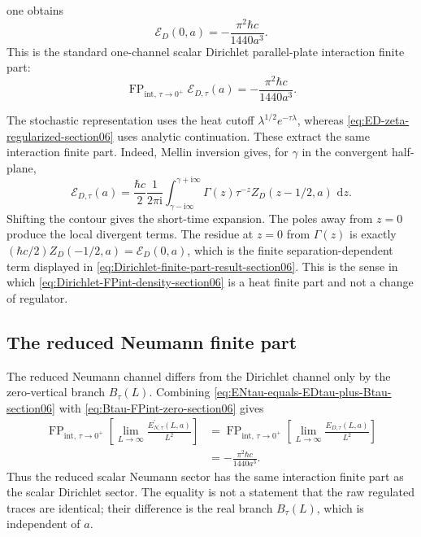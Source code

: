 \documentclass[11pt]{article}
\providecommand{\ii}{\mathrm{i}}
\providecommand{\dd}{\,\mathrm{d}}
\providecommand{\hbarc}{\hbar c}
\providecommand{\FP}{\operatorname{FP}}
\providecommand{\EDtau}{E_{D,\tau}}
\providecommand{\ENtau}{E_{N,\tau}^{\prime}}
\providecommand{\Btau}{B_{\tau}}
\numberwithin{equation}{section}
\begin{document}
one obtains
\begin{equation}
\label{eq:Dirichlet-finite-part-result-section06}
    \mathcal E_D(0,a)
    =
    -\frac{\pi^2\hbarc}{1440a^3}.
\end{equation}
This is the standard one-channel scalar Dirichlet parallel-plate interaction
finite part:
\begin{equation}
\label{eq:Dirichlet-FPint-density-section06}
    \FP_{\mathrm{int},\,\tau\to0^+}\mathcal E_{D,\tau}(a)
    =
    -\frac{\pi^2\hbarc}{1440a^3}.
\end{equation}

\begin{remark}
\label{rem:heat-zeta-compatibility-section06}
The stochastic representation uses the heat cutoff
\(\lambda^{1/2}e^{-\tau\lambda}\), whereas
\eqref{eq:ED-zeta-regularized-section06} uses analytic continuation.  These
extract the same interaction finite part.  Indeed, Mellin inversion gives,
for \(\gamma\) in the convergent half-plane,
\begin{equation}
\label{eq:Mellin-heat-zeta-section06}
    \mathcal E_{D,\tau}(a)
    =
    \frac{\hbarc}{2}\frac{1}{2\pi\ii}
    \int_{\gamma-\ii\infty}^{\gamma+\ii\infty}
    \Gamma(z)\tau^{-z}Z_D(z-1/2,a)\,\dd z .
\end{equation}
Shifting the contour gives the short-time expansion.  The poles away from
\(z=0\) produce the local divergent terms.  The residue at \(z=0\) from
\(\Gamma(z)\) is exactly \((\hbarc/2)Z_D(-1/2,a)
=\mathcal E_D(0,a)\), which is the finite separation-dependent term displayed
in \eqref{eq:Dirichlet-finite-part-result-section06}.  This is the sense in
which \eqref{eq:Dirichlet-FPint-density-section06} is a heat finite part and
not a change of regulator.
\end{remark}

\subsection{The reduced Neumann finite part}
\label{subsec:reduced-neumann-finite-part-section06}

The reduced Neumann channel differs from the Dirichlet channel only by the
zero-vertical branch \(\Btau(L)\).  Combining
\eqref{eq:ENtau-equals-EDtau-plus-Btau-section06} with
\eqref{eq:Btau-FPint-zero-section06} gives
\begin{align}
\label{eq:Neumann-FPint-equals-Dirichlet-section06}
    \FP_{\mathrm{int},\,\tau\to0^+}
    \left[\lim_{L\to\infty}\frac{\ENtau(L,a)}{L^2}\right]
    &=
    \FP_{\mathrm{int},\,\tau\to0^+}
    \left[\lim_{L\to\infty}\frac{\EDtau(L,a)}{L^2}\right] \\
    &=
    -\frac{\pi^2\hbarc}{1440a^3} .
\end{align}
Thus the reduced scalar Neumann sector has the same interaction finite part as
the scalar Dirichlet sector.  The equality is not a statement that the raw
regulated traces are identical; their difference is the real branch
\(\Btau(L)\), which is independent of \(a\).
\end{document}
